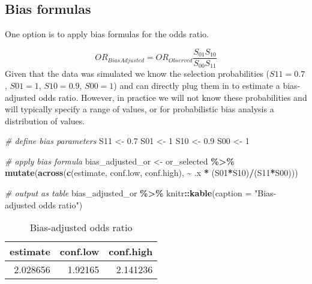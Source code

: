 \documentclass[
]{book}
\newenvironment{Shaded}{\begin{snugshade}}{\end{snugshade}}
\newcommand{\AttributeTok}[1]{\textcolor[rgb]{0.13,0.29,0.53}{#1}}
\newcommand{\CommentTok}[1]{\textcolor[rgb]{0.56,0.35,0.01}{\textit{#1}}}
\newcommand{\DecValTok}[1]{\textcolor[rgb]{0.00,0.00,0.81}{#1}}
\newcommand{\FloatTok}[1]{\textcolor[rgb]{0.00,0.00,0.81}{#1}}
\newcommand{\FunctionTok}[1]{\textcolor[rgb]{0.13,0.29,0.53}{\textbf{#1}}}
\newcommand{\NormalTok}[1]{#1}
\newcommand{\OtherTok}[1]{\textcolor[rgb]{0.56,0.35,0.01}{#1}}
\newcommand{\SpecialCharTok}[1]{\textcolor[rgb]{0.81,0.36,0.00}{\textbf{#1}}}
\newcommand{\StringTok}[1]{\textcolor[rgb]{0.31,0.60,0.02}{#1}}
\begin{document}
\hypertarget{bias-formulas}{%
\subsection{Bias formulas}\label{bias-formulas}}

One option is to apply bias formulas for the odds ratio.

\[
OR_{BiasAdjusted} = OR_{Observed}\frac{S_{01}S_{10}}{S_{00}S_{11}}
\]
Given that the data was simulated we know the selection probabilities (\(S11=0.7\), \(S01=1\), \(S10=0.9\), \(S00=1\)) and can directly plug them in to estimate a bias-adjusted odds ratio. However, in practice we will not know these probabilities and will typically specify a range of values, or for probabilistic bias analysis a distribution of values.

\begin{Shaded}
\begin{Highlighting}[]
\CommentTok{\# define bias parameters}
\NormalTok{S11 }\OtherTok{\textless{}{-}} \FloatTok{0.7}
\NormalTok{S01 }\OtherTok{\textless{}{-}} \DecValTok{1}
\NormalTok{S10 }\OtherTok{\textless{}{-}} \FloatTok{0.9}
\NormalTok{S00 }\OtherTok{\textless{}{-}} \DecValTok{1}

\CommentTok{\# apply bias formula}
\NormalTok{bias\_adjusted\_or }\OtherTok{\textless{}{-}}\NormalTok{ or\_selected }\SpecialCharTok{\%\textgreater{}\%} 
  \FunctionTok{mutate}\NormalTok{(}\FunctionTok{across}\NormalTok{(}\FunctionTok{c}\NormalTok{(estimate, conf.low, conf.high), }\SpecialCharTok{\textasciitilde{}}\NormalTok{ .x }\SpecialCharTok{*}\NormalTok{ (S01}\SpecialCharTok{*}\NormalTok{S10)}\SpecialCharTok{/}\NormalTok{(S11}\SpecialCharTok{*}\NormalTok{S00)))}

\CommentTok{\# output as table}
\NormalTok{bias\_adjusted\_or }\SpecialCharTok{\%\textgreater{}\%} 
\NormalTok{  knitr}\SpecialCharTok{::}\FunctionTok{kable}\NormalTok{(}\AttributeTok{caption =} \StringTok{"Bias{-}adjusted odds ratio"}\NormalTok{)}
\end{Highlighting}
\end{Shaded}

\begin{table}

\caption{\label{tab:unnamed-chunk-9}Bias-adjusted odds ratio}
\centering
\begin{tabular}[t]{r|r|r}
\hline
estimate & conf.low & conf.high\\
\hline
2.028656 & 1.92165 & 2.141236\\
\hline
\end{tabular}
\end{table}
\end{document}
